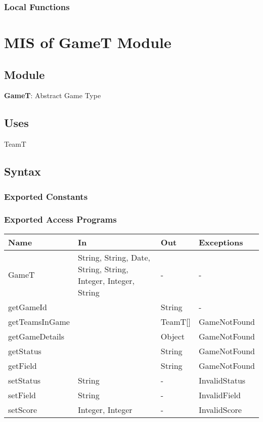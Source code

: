 \documentclass[12pt, titlepage]{article}
\begin{document}
\subsubsection{Local Functions}

\newpage

\section{MIS of GameT Module} \label{GameTModule}

\subsection{Module}
\textbf{GameT}: Abstract Game Type

\subsection{Uses}
TeamT

\subsection{Syntax}

\subsubsection{Exported Constants}

\subsubsection{Exported Access Programs}
\begin{center}
  \begin{tabular}{|p{4cm}| p{4cm}| p{4cm} | p{3cm}|}
  \hline
  \textbf{Name} & \textbf{In} & \textbf{Out} & \textbf{Exceptions} \\
  \hline
  GameT & String, String, Date, String, String, Integer, Integer, String & - & - \\
  getGameId &  & String & - \\
  getTeamsInGame &  & TeamT[] & GameNotFound \\
  getGameDetails &  & Object & GameNotFound \\
  getStatus &  & String & GameNotFound \\
  getField &  & String & GameNotFound \\
  setStatus & String & - & InvalidStatus \\
  setField & String & - & InvalidField \\
  setScore & Integer, Integer & - & InvalidScore \\
  \hline
  \end{tabular}
\end{center}
\end{document}
